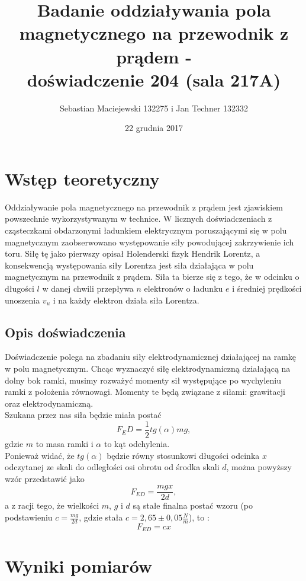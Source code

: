 \documentclass[10pt,a4paper]{article}
\author{Sebastian Maciejewski 132275 i Jan Techner 132332}
\title{Badanie oddziaływania pola magnetycznego na przewodnik z prądem - \\ doświadczenie 204 (sala 217A)}
\date{22 grudnia 2017}
\newcommand{\forceindent}{\leavevmode{\parindent=3em\indent}}
\begin{document}
\maketitle
\section{Wstęp teoretyczny}
\forceindent Oddziaływanie pola magnetycznego na przewodnik z prądem jest zjawiskiem powszechnie wykorzystywanym w technice. W licznych doświadczeniach z cząsteczkami obdarzonymi ładunkiem elektrycznym poruszającymi się w polu magnetycznym zaobserwowano występowanie siły powodującej zakrzywienie ich toru. Siłę tę jako pierwszy opisał Holenderski fizyk Hendrik Lorentz, a konsekwencją występowania siły Lorentza jest siła działająca w polu magnetycznym na przewodnik z prądem. Siła ta bierze się z tego, że w odcinku o długości $l$ w danej chwili przepływa $n$ elektronów o ładunku $e$ i średniej prędkości unoszenia $v_u$ i na każdy elektron działa siła Lorentza.

\subsection*{Opis doświadczenia}
\forceindent Doświadczenie polega na zbadaniu siły elektrodynamicznej działającej na ramkę w polu magnetycznym. Chcąc wyznaczyć siłę elektrodynamiczną działającą na dolny bok ramki, musimy rozważyć momenty sił występujące po wychyleniu ramki z położenia równowagi. Momenty te będą związane z siłami: grawitacji oraz elektrodynamiczną. \\
Szukana przez nas siła będzie miała postać 
\begin{equation}
F_ED = \frac{1}{2} tg(\alpha)mg,
\end{equation}
gdzie $m$ to masa ramki i $\alpha$ to kąt odchylenia.\\
Ponieważ widać, że $tg(\alpha)$ będzie równy stosunkowi długości odcinka $x$ odczytanej ze skali do odległości osi obrotu od środka skali $d$, można powyższy wzór przedstawić jako
\begin{equation}
F_{ED} = \frac{mgx}{2d},
\end{equation}
a z racji tego, że wielkości $m$, $g$ i $d$ są stałe finalna postać wzoru (po podstawieniu $c=\frac{mg}{2d}$, gdzie stała $c =  2,65 \pm 0,05 \frac{N}{m}$), to :
\begin{equation}
F_{ED} = cx
\end{equation}


\newpage
\section{Wyniki pomiarów}
\end{document}
